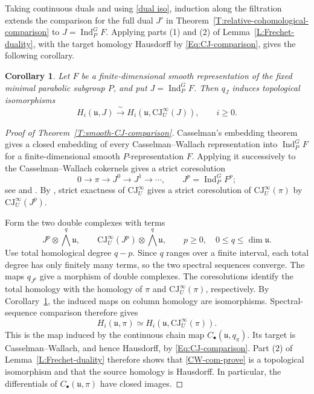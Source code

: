 \documentclass[a4paper,12pt]{amsart}
\numberwithin{equation}{section}
\theoremstyle{plain}
\newtheorem{corollary}[theorem]{Corollary}
\theoremstyle{definition}
\theoremstyle{remark}
\begin{document}
Taking continuous duals and using \eqref{dual iso}, induction along the filtration extends the comparison for the full dual $J'$ in Theorem~\ref{T:relative-cohomological-comparison} to $J=\operatorname{Ind}_P^G F$.
Applying parts (1) and (2) of Lemma~\ref{L:Frechet-duality}, with the target homology Hausdorff by \eqref{Eq:CJ-comparison}, gives the following corollary.

\begin{corollary}\label{P:principal-CJ-comparison}
Let $F$ be a finite-dimensional smooth representation of the fixed minimal parabolic subgroup $P$, and put $J=\operatorname{Ind}_P^G F$.
Then $q_J$ induces topological isomorphisms
\[
 H_i(\mathfrak u,J)\xrightarrow{\ \sim\ }
 H_i(\mathfrak u,\mathrm{CJ}^{\infty}_U(J)),\qquad i\geq0.
\]
\end{corollary}

\begin{proof}[Proof of Theorem~\ref{T:smooth-CJ-comparison}]
Casselman's embedding theorem gives a closed embedding of every Casselman--Wallach representation into $\operatorname{Ind}_P^G F$ for a finite-dimensional smooth $P$-representation $F$.
Applying it successively to the Casselman--Wallach cokernels gives a strict coresolution
\[
 0\longrightarrow\pi\longrightarrow J^0\longrightarrow J^1
 \longrightarrow\cdots,\qquad J^p=\operatorname{Ind}_P^G F^p;
\]
see \cite[Proposition~4.2.3]{Wallach1} and \cite[Proposition~3]{Hecht-Taylor3}.
By \cite[Theorem~14.3]{CWYZ}, strict exactness of $\mathrm{CJ}^{\infty}_U$ gives a strict coresolution of $\mathrm{CJ}^{\infty}_U(\pi)$ by $\mathrm{CJ}^{\infty}_U(J^p)$.

Form the two double complexes with terms
\[
 J^p\otimes\bigwedge^q\mathfrak u,
 \qquad
 \mathrm{CJ}^{\infty}_U(J^p)\otimes\bigwedge^q\mathfrak u,
 \qquad p\geq0,\quad 0\leq q\leq\dim\mathfrak u.
\]
Use total homological degree $q-p$.
Since $q$ ranges over a finite interval, each total degree has only finitely many terms, so the two spectral sequences converge.
The maps $q_{J^p}$ give a morphism of double complexes.
The coresolutions identify the total homology with the homology of $\pi$ and $\mathrm{CJ}^{\infty}_U(\pi)$, respectively.
By Corollary~\ref{P:principal-CJ-comparison}, the induced maps on column homology are isomorphisms.
Spectral-sequence comparison therefore gives
\begin{equation}\label{CW-com-prove}
 H_i(\mathfrak u,\pi)\simeq
 H_i(\mathfrak u,\mathrm{CJ}^{\infty}_U(\pi)).
\end{equation}
This is the map induced by the continuous chain map $C_\bullet(\mathfrak u,q_\pi)$.
Its target is Casselman--Wallach, and hence Hausdorff, by \eqref{Eq:CJ-comparison}.
Part (2) of Lemma~\ref{L:Frechet-duality} therefore shows that \eqref{CW-com-prove} is a topological isomorphism and that the source homology is Hausdorff.
In particular, the differentials of $C_\bullet(\mathfrak u,\pi)$ have closed images.
\end{proof}
\end{document}
